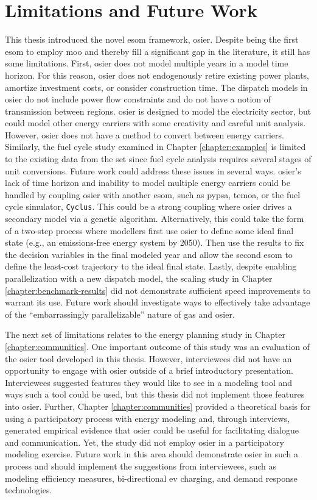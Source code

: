 \section{Limitations and Future Work}
\label{section:limitations-future-work}
This thesis introduced the novel \ac{esom} framework, \ac{osier}. Despite being
the first \ac{esom} to employ \ac{moo} and thereby fill a significant gap in the
literature, it still has some limitations. First, \ac{osier} does not model
multiple years in a model time horizon. For this reason, \ac{osier} does not
endogenously retire existing power plants, amortize investment costs, or
consider construction time. The dispatch models in \ac{osier} do not include
power flow constraints and do not have a notion of transmission between regions.
\ac{osier} is designed to model the electricity sector, but could model other
energy carriers with some creativity and careful unit analysis. However,
\ac{osier} does not have a method to convert between energy carriers. Similarly,
the fuel cycle study examined in Chapter \ref{chapter:examples} is limited to
the existing data from the \acf{set} since fuel cycle analysis requires several
stages of unit conversions. Future work could address these issues in several
ways. \ac{osier}'s lack of time horizon and inability to model multiple energy
carriers could be handled by coupling \ac{osier} with another \ac{esom}, such as
\ac{pypsa}, \ac{temoa}, or the fuel cycle simulator, \texttt{Cyclus}. This could
be a strong coupling where \ac{osier} drives a secondary model via a genetic
algorithm. Alternatively, this could take the form of a two-step process where
modellers first use \ac{osier} to define some ideal final state (e.g., an
emissions-free energy system by 2050). Then use the results to fix the decision
variables in the final modeled year and allow the second \ac{esom} to define the
least-cost trajectory to the ideal final state. Lastly, despite enabling
parallelization with a new dispatch model, the scaling study in Chapter
\ref{chapter:benchmark-results} did not demonstrate sufficient speed
improvements to warrant its use. Future work should investigate ways to
effectively take advantage of the ``embarrassingly parallelizable'' nature of
\acp{ga} and \ac{osier}.

The next set of limitations relates to the energy planning study in Chapter
\ref{chapter:communities}. One important outcome of this study was an evaluation
of the \ac{osier} tool developed in this thesis. However, interviewees did not
have an opportunity to engage with \ac{osier} outside of a brief introductory
presentation. Interviewees suggested features they would like to see in a
modeling tool and ways such a tool could be used, but this thesis did not
implement those features into \ac{osier}. Further, Chapter
\ref{chapter:communities} provided a theoretical basis for using a participatory
process with energy modeling and, through interviews, generated empirical
evidence that \ac{osier} could be useful for facilitating dialogue and
communication. Yet, the study did not employ \ac{osier} in a participatory
modeling exercise. Future work in this area should demonstrate \ac{osier} in
such a process and should implement the suggestions from interviewees, such as
modeling efficiency measures, bi-directional \ac{ev} charging, and demand
response technologies.
